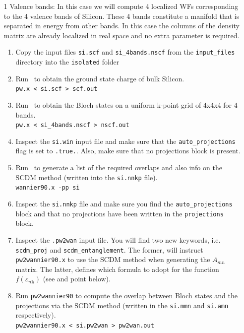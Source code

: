 \documentclass[a4paper,11pt,twoside]{article}
\begin{document}
\begin{itemize}
  \item[1]{Valence bands: In this case we will compute 4 localized WFs corresponding to the 4 valence bands of Silicon. These 4 bands constitute a manifold that is separated in energy from other bands. In this case the columns of the density matrix are already localized in real space and no extra parameter is required.}
  \begin{enumerate}
    \item Copy the input files {\tt si.scf} and {\tt si\_4bands.nscf} from the {\tt input\_files} directory into the {\tt isolated} folder
    \item Run \pwscf\ to obtain the ground state charge of bulk Silicon. \\
    {\tt pw.x < si.scf > scf.out}

    \item Run \pwscf\ to obtain the Bloch states on a uniform k-point grid of 4x4x4 for 4 bands. \\
    {\tt pw.x < si\_4bands.nscf > nscf.out}
    
    \item Inspect the {\tt si.win} input file and make sure that the {\tt auto\_projections} flag is set to {\tt .true.}. Also, make sure that no projections block is present.
    \item Run \wannier\ to generate a list of the required overlaps and also info on the SCDM method (written
    into the {\tt si.nnkp} file).\\ 
    {\tt wannier90.x -pp si}
    \item Inspect the {\tt si.nnkp} file and make sure you find the {\tt auto\_projections} block and that no projections have been written in the {\tt projections} block.

    \item Inspect the {\tt .pw2wan} input file. You will find two new keywords, i.e. {\tt scdm\_proj} and {\tt scdm\_entanglement}. The former, will instruct {\tt pw2wannier90.x}  to use the SCDM method when generating the $A_{mn}$ matrix. The latter, defines which formula to adopt for the function $f(\varepsilon_{n\mathbf{k}})$ (see \cite{LinLin-ArXiv2017} and point below).
    \item Run {\tt pw2wannier90} to compute the overlap between Bloch
    states and the projections via the SCDM method (written in the
    {\tt si.mmn} and {\tt si.amn} respectively).\\  
    {\tt pw2wannier90.x < si.pw2wan > pw2wan.out}


\end{enumerate}
\end{itemize}
\end{document}
